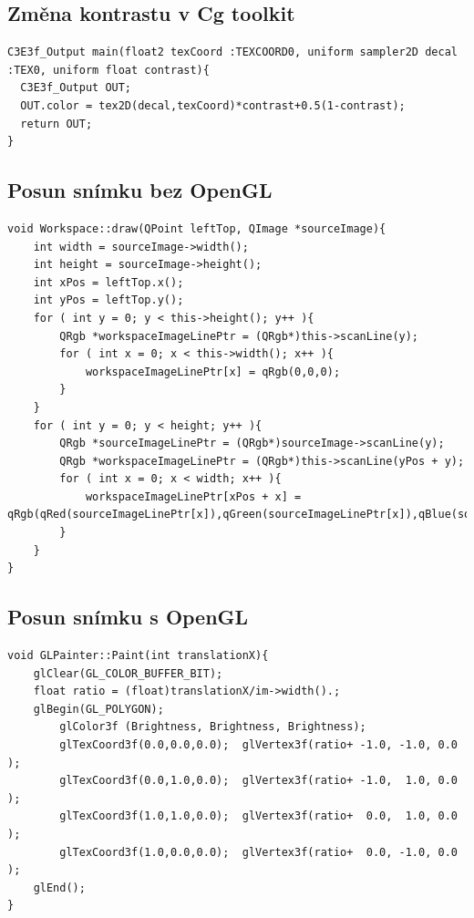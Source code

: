 \subsection{Změna kontrastu v Cg toolkit}

\begin{lstlisting}[label=DicomImageClass,caption={...}]
C3E3f_Output main(float2 texCoord :TEXCOORD0, uniform sampler2D decal :TEX0, uniform float contrast){
  C3E3f_Output OUT;
  OUT.color = tex2D(decal,texCoord)*contrast+0.5(1-contrast);
  return OUT;
}
\end{lstlisting}

\subsection{Posun snímku bez OpenGL}
\begin{lstlisting}
void Workspace::draw(QPoint leftTop, QImage *sourceImage){
	int width = sourceImage->width();
	int height = sourceImage->height();
	int xPos = leftTop.x();
	int yPos = leftTop.y();
	for ( int y = 0; y < this->height(); y++ ){
		QRgb *workspaceImageLinePtr = (QRgb*)this->scanLine(y);
		for ( int x = 0; x < this->width(); x++ ){
			workspaceImageLinePtr[x] = qRgb(0,0,0);
		}
	}
	for ( int y = 0; y < height; y++ ){
		QRgb *sourceImageLinePtr = (QRgb*)sourceImage->scanLine(y);
		QRgb *workspaceImageLinePtr = (QRgb*)this->scanLine(yPos + y);
		for ( int x = 0; x < width; x++ ){
			workspaceImageLinePtr[xPos + x] = qRgb(qRed(sourceImageLinePtr[x]),qGreen(sourceImageLinePtr[x]),qBlue(sourceImageLinePtr[x]));
		}
	}
}
\end{lstlisting}

\subsection{Posun snímku s OpenGL}

\begin{lstlisting}
void GLPainter::Paint(int translationX){
	glClear(GL_COLOR_BUFFER_BIT);
	float ratio = (float)translationX/im->width().;
	glBegin(GL_POLYGON);
		glColor3f (Brightness, Brightness, Brightness);
		glTexCoord3f(0.0,0.0,0.0);	glVertex3f(ratio+ -1.0, -1.0, 0.0 );
		glTexCoord3f(0.0,1.0,0.0);	glVertex3f(ratio+ -1.0,  1.0, 0.0 );
		glTexCoord3f(1.0,1.0,0.0);	glVertex3f(ratio+  0.0,  1.0, 0.0 );
		glTexCoord3f(1.0,0.0,0.0);	glVertex3f(ratio+  0.0, -1.0, 0.0 );
	glEnd();
}
\end{lstlisting}






























